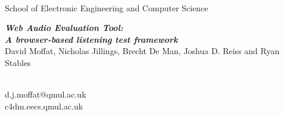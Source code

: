 \begin{center}
\colorbox{qmuldarkblue}
{
 \color{white}

 \parbox{1.0\textwidth}
 {
  \parbox{0.2\textwidth}
  {
   \begin{center}
   \\[1ex]
   \textrm
   {
    \footnotesize
    {\fontsize{1cm}{1.2cm}\selectfont
    School of Electronic Engineering and Computer Science
    }
   }
   \end{center}
  }
  \parbox{0.58\textwidth}
  {
   \vspace{1cm}
   \begin{center}
    {\veryHuge \bf \em Web Audio Evaluation Tool:\\ A browser-based listening test framework}\\[1ex]
    {\Large David Moffat, Nicholas Jillings, Brecht De Man, Joshua D. Reiss and Ryan Stables}
   \end{center}
   \vspace{1cm}
  }
  \parbox{0.2\textwidth}
  {
   \begin{center}
   \\[1ex]
   \textrm
   {
     {\fontsize{1cm}{1.2cm}\selectfont
   d.j.moffat@qmul.ac.uk\\
    c4dm.eecs.qmul.ac.uk\\
    }
   }
   \end{center}
  }
 }
}
\end{center}
